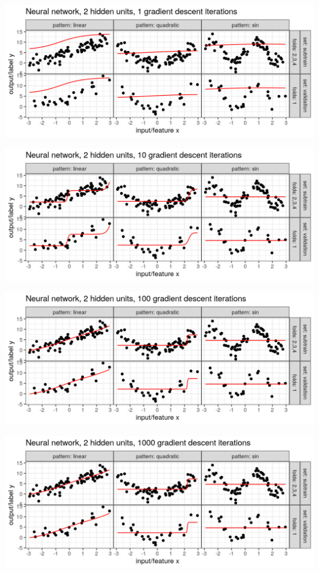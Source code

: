 
\begin{frame}
  \includegraphics[width=\textwidth]{figure-overfitting-pred-units=2-maxit=1.png}
\end{frame}


\begin{frame}
  \includegraphics[width=\textwidth]{figure-overfitting-pred-units=2-maxit=10.png}
\end{frame}


\begin{frame}
  \includegraphics[width=\textwidth]{figure-overfitting-pred-units=2-maxit=100.png}
\end{frame}


\begin{frame}
  \includegraphics[width=\textwidth]{figure-overfitting-pred-units=2-maxit=1000.png}
\end{frame}


